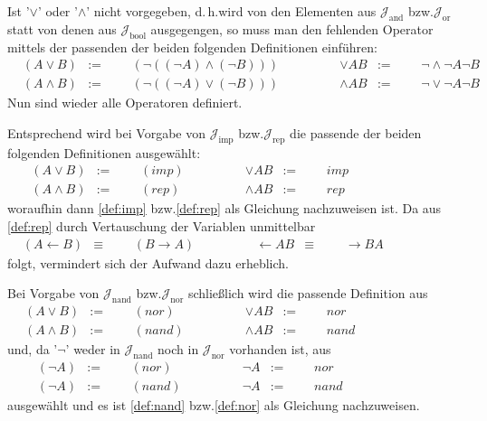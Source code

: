 \documentclass[english,ngerman,parskip=half,headsepline,footsepline,
	fleqn,notitlepage]{scrreprt}
\makeatletter
\newcommand*{\defeq}{:=}%
\newcommand*{\lrep}{\leftarrow}%
\newcommand*{\limp}{\rightarrow}%
\newcommand*{\asJ}{\mathcal{J}}%
\newcommand*{\xAnd}{\mathrm{and}}%
\newcommand*{\xBool}{\mathrm{bool}}%
\newcommand*{\xImp}{\mathrm{imp}}%
\newcommand*{\xNand}{\mathrm{nand}}%
\newcommand*{\xNor}{\mathrm{nor}}%
\newcommand*{\xOr}{\mathrm{or}}%
\newcommand*{\xRep}{\mathrm{rep}}%
\newcommand*{\formulatoleft}{&&&&&&&&&&}%
\newcommand*{\formulaspace}{&&&&}%
\newcommand*{\charqt}[1]{'#1'}%
\newcommand*{\symqt}[1]{\charqt{#1}}%
\newcommand*{\textbzw}{bzw.\@ }
\newcommand*{\textdh}{d.\@\,h.\@ }
\makeatother
\begin{document}
	Ist \symqt{$\lor$} oder \symqt{$\land$} nicht vorgegeben, \textdh wird von den Elementen aus $\asJ_\xAnd$ \textbzw $\asJ_\xOr$ statt von denen aus $\asJ_\xBool$ ausgegengen, so muss man den fehlenden Operator mittels der passenden der beiden folgenden Definitionen einführen:
	\begin{align}
		&          (A \lor B) & \defeq & & & (\lnot ((\lnot A) \land (\lnot B)))
		& \formulaspace & \lor  A B & \defeq & & & \lnot \land \lnot A \lnot B
		\label{def:orand}
		\\
		&          (A \land B) & \defeq & & & (\lnot ((\lnot A) \lor (\lnot B)))
		& \formulaspace & \land A B & \defeq & & & \lnot \lor \lnot A \lnot B
		\label{def:andor}
		\formulatoleft
	\end{align}
	Nun sind wieder alle Operatoren definiert.

	Entsprechend wird bei Vorgabe von $\asJ_\xImp$ \textbzw $\asJ_\xRep$ die passende der beiden folgenden Definitionen ausgewählt:
	\begin{align}
		&              (A \lor  B)  & \defeq & & & (imp)
		& \formulaspace & \lor  A B & \defeq & & &  imp
		\label{def:orrep}
		\\
		&              (A \land B)  & \defeq & & & (rep)
		& \formulaspace & \land A B & \defeq & & &  rep
		\label{def:andrep}
		\formulatoleft
	\end{align}
	woraufhin dann \ref{def:imp} \textbzw \ref{def:rep} als Gleichung nachzuweisen ist.
	Da aus \ref{def:rep} durch Vertauschung der Variablen unmittelbar
	\begin{align}
		&              (A \lrep B)  & \equiv & & & (B \limp A)
		& \formulaspace & \lrep A B & \equiv & & &    \limp B A
		\label{eq:repimp}
		\formulatoleft
	\end{align}
	folgt, vermindert sich der Aufwand dazu erheblich.

	Bei Vorgabe von $\asJ_\xNand$ \textbzw $\asJ_\xNor$ schließlich
	wird die passende Definition aus
	\begin{align}
		&              (A \lor  B)  & \defeq & & & (nor)
		& \formulaspace & \lor  A B & \defeq & & &  nor
		\label{def:ornor}
		\\
		&              (A \land B)  & \defeq & & & (nand)
		& \formulaspace & \land A B & \defeq & & &  nand
		\label{def:andnand}
		\formulatoleft
	\end{align}
	und, da \symqt{$\lnot$} weder in $\asJ_\xNand$ noch in $\asJ_\xNor$ vorhanden ist, aus
	\begin{align}
		&                (\lnot A) & \defeq & & & (nor)
		& \formulaspace & \lnot A  & \defeq & & &  nor
		\label{def:notnor}
		\\
		&                (\lnot A) & \defeq & & & (nand)
		& \formulaspace & \lnot A  & \defeq & & &  nand
		\label{def:notnand}
		\formulatoleft
	\end{align}
	ausgewählt und es ist \ref{def:nand} \textbzw \ref{def:nor} als Gleichung nachzuweisen.
\end{document}
